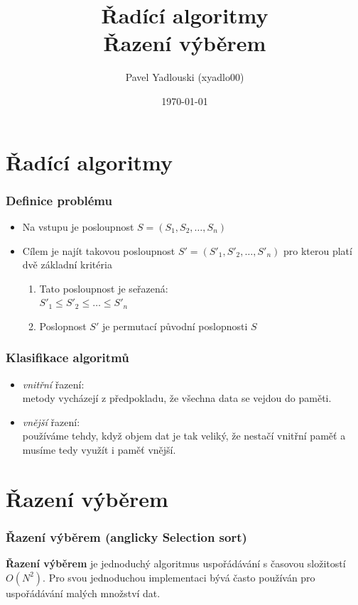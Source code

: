 \documentclass[12pt, hyperref={unicode}]{beamer}
\title{Řadící algoritmy \\ Řazení výběrem}
\author{Pavel Yadlouski (xyadlo00)}
\institute{Vysoké učení technické v Brně \\  Fakulta informačních technologii}
\date{\today}
\begin{document}
\begin{frame}
	\titlepage
\end{frame}

\section{Řadící algoritmy}
\begin{frame}
	\frametitle{Definice problému}
	\begin{itemize}
		\item Na vstupu je posloupnost $S = (S_1,S_2,\ldots,S_n)$	
		\pause		
		\item Cílem je najít takovou posloupnost $S' = (S'_1,S'_2,\ldots,S'_n)$ pro kterou platí dvě základní kritéria
		\begin{enumerate}
			\item Tato posloupnost je seřazená: \\ $S'_1 \leq S'_2 \leq \ldots \leq S'_n$ 
			\item Poslopnost $S'$ je permutací původní poslopnosti $S$		
		\end{enumerate}
	\end{itemize}
		
\end{frame}

\begin{frame}
	\frametitle{Klasifikace algoritmů}
	\begin{itemize}
		\item \textit{vnitřní} řazení: \\ metody vycházejí z předpokladu, že všechna data se vejdou
do paměti.
		\pause
		\item \textit{vnější} řazení: \\ používáme tehdy, když objem dat je tak veliký, že nestačí
vnitřní paměť a musíme tedy využít i paměť vnější.
	\end{itemize}	
\end{frame}

\section{Řazení výběrem}
\begin{frame}
	\frametitle{Řazení výběrem (anglicky Selection sort)}
	\textbf{Řazení výběrem} je jednoduchý algoritmus uspořádávání s časovou
složitostí $O(N^2)$. Pro svou jednoduchou implementaci bývá často používán pro uspořádávání
malých množství dat.
\end{frame}
\end{document}
